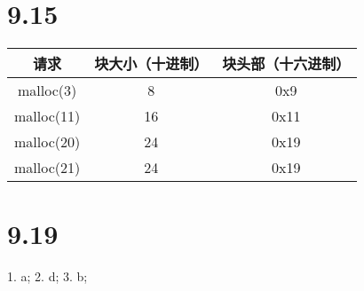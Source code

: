 \documentclass[11pt]{article}
\begin{document}
\section*{9.15}
\begin{tabular}[htbp!]{|c|c|c|}
  \toprule
  请求 & 块大小（十进制） & 块头部（十六进制） \\\midrule
  malloc(3) & 8 & 0x9 \\\midrule
  malloc(11) & 16 & 0x11 \\\midrule
  malloc(20) & 24 & 0x19 \\\midrule
  malloc(21) & 24 & 0x19 \\\bottomrule
\end{tabular}

\section*{9.19}
1. a; 2. d; 3. b;
\end{document}
